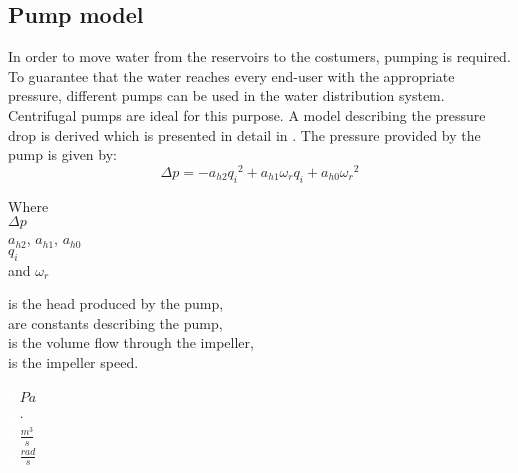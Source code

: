 \subsection{Pump model} 
\label{PumpModel}
In order to move water from the reservoirs to the costumers, pumping is required. To guarantee that the water reaches every end-user with the appropriate pressure, different pumps can be used in the water distribution system.\\
Centrifugal pumps are ideal for this purpose. 
A model describing the pressure drop is derived which is presented in detail in \cite{Phd_Carsten}. The pressure provided by the pump is given by:
\begin{equation}
  \Delta p = -a_{h2}{q_i}^2 + a_{h1} \omega_r q_i + a_{h0}{\omega_r}^2
  \label{PumpModel}
\end{equation}

\begin{minipage}[t]{0.20\textwidth}
Where\\
\hspace*{8mm} $\Delta p$ \\
\hspace*{8mm} $a_{h2}$, $a_{h1}$, $a_{h0}$ \\
\hspace*{8mm} $q_i$ \\
and \hspace*{0.7mm} $\omega_r$ 

\end{minipage}
\begin{minipage}[t]{0.68\textwidth}
\vspace*{2mm}
is the head produced by the pump,\\
are constants describing the pump,\\
is the volume flow through the impeller,\\
is the impeller speed.
\end{minipage}
\begin{minipage}[t]{0.10\textwidth}
\vspace*{2mm}
\textcolor{White}{te}$\unit{Pa}$\\
\textcolor{White}{te}$\unit{\cdot}$\\
\textcolor{White}{te}$\unit{\frac{m^3}{s}}$\\
\textcolor{White}{te}$\unit{\frac{rad}{s}}$
\end{minipage}	


